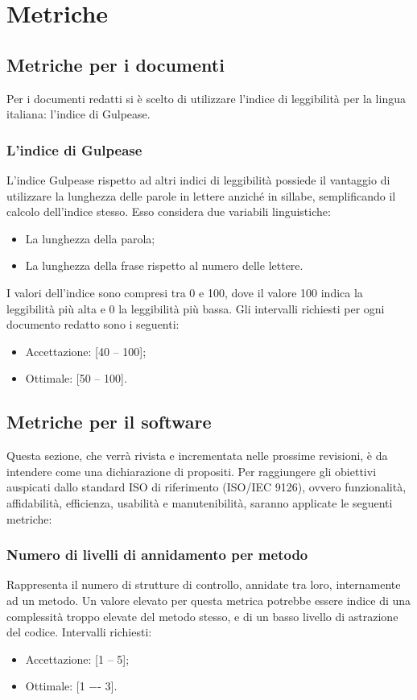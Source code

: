 \newpage

\section{Metriche}

\subsection{Metriche per i documenti}
Per i documenti redatti si è scelto di utilizzare l'indice di leggibilità per la lingua italiana: l'indice di Gulpease.

\subsubsection{L'indice di Gulpease}
L'indice Gulpease rispetto ad altri indici di leggibilità possiede il vantaggio di utilizzare la lunghezza delle parole in lettere anziché in sillabe, semplificando il calcolo dell'indice stesso. Esso considera due variabili linguistiche:
\begin{itemize}
\item La lunghezza della parola;
\item La lunghezza della frase rispetto al numero delle lettere.
\end{itemize}

I valori dell'indice sono compresi tra 0 e 100, dove il valore 100 indica la leggibilità più alta e 0 la leggibilità più bassa.
Gli intervalli richiesti per ogni documento redatto sono i seguenti:
\begin{itemize}
\item Accettazione: [40 -- 100];
\item Ottimale: [50 -- 100].
\end{itemize}

\subsection{Metriche per il software}

Questa sezione, che verrà rivista e incrementata nelle prossime revisioni, è da intendere come una dichiarazione di propositi.
Per raggiungere gli obiettivi auspicati dallo standard ISO di riferimento (ISO/IEC 9126), ovvero funzionalità, affidabilità,
efficienza, usabilità e manutenibilità, saranno applicate le seguenti metriche:

\subsubsection{Numero di livelli di annidamento per metodo}
Rappresenta il numero di strutture di controllo, annidate tra loro, internamente ad un metodo.
Un valore elevato per questa metrica potrebbe essere indice di una complessità troppo elevate del metodo stesso, e di un basso livello di astrazione del codice.
Intervalli richiesti:
\begin{itemize}
\item
Accettazione: [1 -- 5];
\item
Ottimale: [1 −- 3].
\end{itemize}

